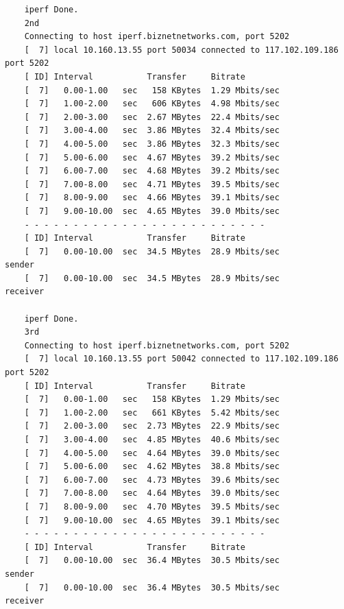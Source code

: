 \documentclass[paper=a4, fontsize=10pt]{scrartcl} %
\numberwithin{equation}{section} %
\numberwithin{figure}{section} %
\numberwithin{table}{section} %
\begin{document}
\begin{lstlisting}
    iperf Done.
    2nd
    Connecting to host iperf.biznetnetworks.com, port 5202
    [  7] local 10.160.13.55 port 50034 connected to 117.102.109.186 port 5202
    [ ID] Interval           Transfer     Bitrate
    [  7]   0.00-1.00   sec   158 KBytes  1.29 Mbits/sec                  
    [  7]   1.00-2.00   sec   606 KBytes  4.98 Mbits/sec                  
    [  7]   2.00-3.00   sec  2.67 MBytes  22.4 Mbits/sec                  
    [  7]   3.00-4.00   sec  3.86 MBytes  32.4 Mbits/sec                  
    [  7]   4.00-5.00   sec  3.86 MBytes  32.3 Mbits/sec                  
    [  7]   5.00-6.00   sec  4.67 MBytes  39.2 Mbits/sec                  
    [  7]   6.00-7.00   sec  4.68 MBytes  39.2 Mbits/sec                  
    [  7]   7.00-8.00   sec  4.71 MBytes  39.5 Mbits/sec                  
    [  7]   8.00-9.00   sec  4.66 MBytes  39.1 Mbits/sec                  
    [  7]   9.00-10.00  sec  4.65 MBytes  39.0 Mbits/sec                  
    - - - - - - - - - - - - - - - - - - - - - - - - -
    [ ID] Interval           Transfer     Bitrate
    [  7]   0.00-10.00  sec  34.5 MBytes  28.9 Mbits/sec                  sender
    [  7]   0.00-10.00  sec  34.5 MBytes  28.9 Mbits/sec                  receiver
    
    iperf Done.
    3rd
    Connecting to host iperf.biznetnetworks.com, port 5202
    [  7] local 10.160.13.55 port 50042 connected to 117.102.109.186 port 5202
    [ ID] Interval           Transfer     Bitrate
    [  7]   0.00-1.00   sec   158 KBytes  1.29 Mbits/sec                  
    [  7]   1.00-2.00   sec   661 KBytes  5.42 Mbits/sec                  
    [  7]   2.00-3.00   sec  2.73 MBytes  22.9 Mbits/sec                  
    [  7]   3.00-4.00   sec  4.85 MBytes  40.6 Mbits/sec                  
    [  7]   4.00-5.00   sec  4.64 MBytes  39.0 Mbits/sec                  
    [  7]   5.00-6.00   sec  4.62 MBytes  38.8 Mbits/sec                  
    [  7]   6.00-7.00   sec  4.73 MBytes  39.6 Mbits/sec                  
    [  7]   7.00-8.00   sec  4.64 MBytes  39.0 Mbits/sec                  
    [  7]   8.00-9.00   sec  4.70 MBytes  39.5 Mbits/sec                  
    [  7]   9.00-10.00  sec  4.65 MBytes  39.1 Mbits/sec                  
    - - - - - - - - - - - - - - - - - - - - - - - - -
    [ ID] Interval           Transfer     Bitrate
    [  7]   0.00-10.00  sec  36.4 MBytes  30.5 Mbits/sec                  sender
    [  7]   0.00-10.00  sec  36.4 MBytes  30.5 Mbits/sec                  receiver
    

\end{lstlisting}
\end{document}
